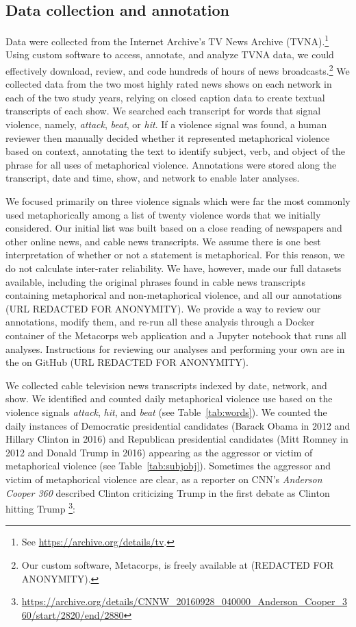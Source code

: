 \subsection{Data collection and annotation}

Data were collected from the Internet Archive's TV News Archive
(TVNA).\footnote{See \url{https://archive.org/details/tv}.} Using custom
software to access, annotate, and analyze TVNA data, we could effectively
download, review, and code hundreds of hours of news broadcasts.\footnote{Our
custom software, Metacorps, is freely available at
(REDACTED FOR ANONYMITY).} We collected data from the two
most highly rated news shows on each network in each of the two study years,
relying on closed caption data  to create textual transcripts of each show. We
searched each transcript for words that signal violence, namely, \emph{attack},
\emph{beat}, or \emph{hit}. If a violence signal was found, a human reviewer
then manually decided whether it represented metaphorical violence based on
context, annotating the text to identify subject, verb, and object of the phrase
for all uses of metaphorical violence. Annotations were stored along the
transcript, date and time, show, and network to enable later analyses.

We focused primarily on three violence signals which were far the most commonly
used metaphorically among a list of twenty violence words that we initially 
considered. Our initial list was built based on a close reading of newspapers 
and other online news, and cable news transcripts. We assume there is one 
best interpretation of whether or not a statement is metaphorical. For this reason,
we do not calculate inter-rater reliability. We have, however, made our 
full datasets available, including the original phrases found in cable news 
transcripts containing metaphorical and non-metaphorical violence, and all
our annotations (URL REDACTED FOR ANONYMITY). We provide a way to review our 
annotations, modify them, and re-run all these analysis through a Docker 
container of the Metacorps web application and a Jupyter notebook that 
runs all analyses. Instructions for reviewing our analyses and performing your
own are in the on GitHub (URL REDACTED FOR ANONYMITY).

We collected cable television news transcripts indexed by date, network, and
show. We identified and counted daily metaphorical
violence use based on the violence signals \emph{attack}, \emph{hit}, and
\emph{beat} (see Table~\ref{tab:words}). We counted the daily instances of
Democratic presidential candidates (Barack Obama in 2012 and Hillary Clinton in
2016) and Republican presidential candidates (Mitt Romney in 2012 and Donald
Trump in 2016) appearing as the aggressor or victim of metaphorical violence
(see Table~\ref{tab:subjobj}). Sometimes the aggressor and victim of metaphorical 
violence are clear, as a reporter on CNN's \emph{Anderson Cooper 360}
described Clinton criticizing Trump in the first debate as Clinton hitting Trump
\footnote{\url{https://archive.org/details/CNNW_20160928_040000_Anderson_Cooper_360/start/2820/end/2880}}:

